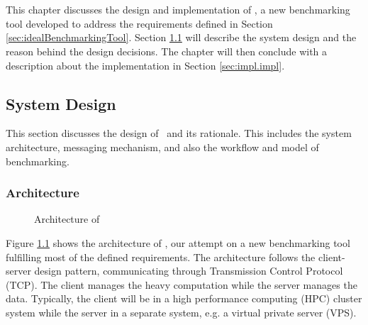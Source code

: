 \chapter{\chImplementation}
\label{ch:implementation}

This chapter discusses the design and implementation of \OurBenchmarkingTool, a new benchmarking tool developed to address the requirements defined in Section \ref{sec:idealBenchmarkingTool}.
Section \ref{sec:impl.design} will describe the system design and the reason behind the design decisions.
The chapter will then conclude with a description about the implementation in Section \ref{sec:impl.impl}.

\section{System Design}
\label{sec:impl.design}

This section discusses the design of \OurBenchmarkingTool~and its rationale.
This includes the system architecture, messaging mechanism, and also the workflow and model of benchmarking.

\subsection{Architecture}
\label{sec:impl.architecture}

\begin{figure}
    \centering
    \caption{Architecture of \OurBenchmarkingTool}
    \label{fig:architecture}
\end{figure}

Figure \ref{fig:architecture} shows the architecture of \OurBenchmarkingTool, our attempt on a new benchmarking tool fulfilling most of the defined requirements.
The architecture follows the client-server design pattern, communicating through Transmission Control Protocol (TCP).
The client manages the heavy computation while the server manages the data.
Typically, the client will be in a high performance computing (HPC) cluster system while the server in a separate system, e.g. a virtual private server (VPS).

